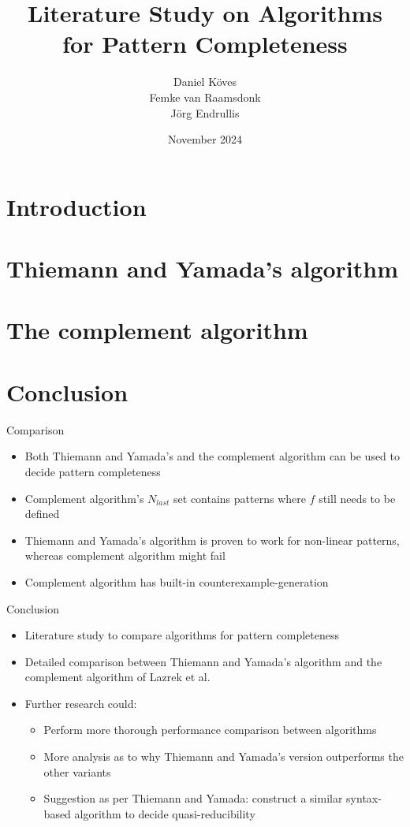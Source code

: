 \documentclass[onlytextwidth]{beamer}
\title{Literature Study on Algorithms \\for Pattern Completeness}
\author[Daniel Köves]{
    Daniel Köves\\
    \vspace*{0.3cm}
    \scriptsize{Femke van Raamsdonk}\\
    \scriptsize{Jörg Endrullis}
}
\institute{Vrije Universiteit Amsterdam}
\date{November 2024}
\begin{document}
\frame{\titlepage}

\section{Introduction}


\section{Thiemann and Yamada's algorithm}


\section{The complement algorithm}


\section{Conclusion}
\begin{frame}{Comparison}
    \begin{itemize}
        \item Both Thiemann and Yamada's and the complement algorithm can be used to decide pattern completeness
        \item Complement algorithm's $N_{last}$ set contains patterns where $f$ still needs to be defined
        \item Thiemann and Yamada's algorithm is proven to work for non-linear patterns, whereas complement algorithm might fail
        \item Complement algorithm has built-in counterexample-generation
    \end{itemize}
\end{frame}

\begin{frame}{Conclusion}
    \begin{itemize}
        \item Literature study to compare algorithms for pattern completeness
        \item Detailed comparison between Thiemann and Yamada's algorithm and the complement algorithm of Lazrek et al.
        \item Further research could:
            \begin{itemize}
                \item Perform more thorough performance comparison between algorithms
                \item More analysis as to why Thiemann and Yamada's version outperforms the other variants
                \item Suggestion as per Thiemann and Yamada: construct a similar syntax-based algorithm to decide quasi-reducibility
            \end{itemize}
    \end{itemize}
\end{frame}
\end{document}
